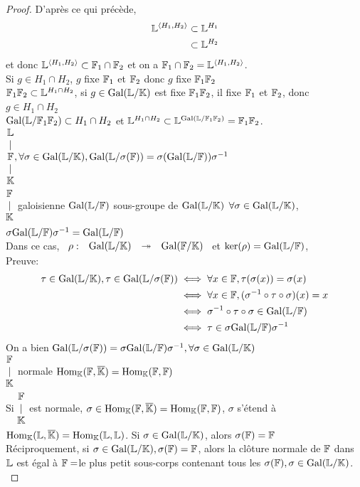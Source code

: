 \documentclass[]{report}
\begin{document}
\begin{proof}
        D'après ce qui précède,
        \begin{align*}
            \La^{\sca{H_1,H_2}}&\subset \La^{H_1}\\
            &\subset \La^{H_2}
        \end{align*}
        et donc $\La^{\sca{H_1,H_2}}\subset \Fa_1\cap \Fa_2$ et on a $\Fa_1\cap \Fa_2=\La^{\sca{H_1,H_2}}$.\\
        Si $g\in H_1\cap H_2$, $g$ fixe $\Fa_1$ et $\Fa_2$ donc $g$ fixe $\Fa_1\Fa_2$\\
        $\Fa_1\Fa_2\subset \La^{H_1\cap H_2}$, si $g\in \Gal(\La/\K)$ est fixe $\Fa_1\Fa_2$, il fixe $\Fa_1$ et $\Fa_2$, donc $g\in H_1\cap H_2$\\
        $\Gal(\La/\Fa_1\Fa_2)\subset H_1\cap H_2$ et $\La^{H_1\cap H_2}\subset \La^{\Gal(\La/\Fa_1\Fa_2)}=\Fa_1\Fa_2$.
        $\ext{\La}{\ext{\Fa}{\K}}, \forall \sigma\in \Gal(\La/\K),\Gal(\La/\sigma(\Fa))=\sigma(\Gal(\La/\Fa))\sigma^{-1}$\\
        $\ext{\Fa}{\K}$ galoisienne \ssi $\Gal(\La/\Fa)$ sous-groupe de $\Gal (\La/\K)$ \ssi $\forall \sigma\in \Gal(\La/\K)$, $\sigma\Gal(\La/\Fa)\sigma^{-1}=\Gal(\La/\Fa)$\\
        Dans ce cas, $\funtosurj{\rho}{\Gal(\La/\K)}{\Gal(\Fa/\K)}$ et $\ker(\rho)=\Gal(\La/\Fa)$,\\
        Preuve: 
        \begin{align*}
            \tau\in \Gal(\La/\K), \tau\in \Gal(\La/\sigma(\Fa))&\iff \forall x\in \Fa,\tau(\sigma(x))=\sigma(x)\\
            &\iff \forall x\in \Fa,(\sigma^{-1}\circ\tau\circ\sigma)(x)=x\\
            &\iff \sigma^{-1}\circ \tau \circ \sigma\in \Gal(\La/\Fa)\\
            &\iff \tau\in \sigma\Gal(\La/\Fa)\sigma^{-1}
        \end{align*}
        On a bien $\Gal(\La/\sigma(\Fa))=\sigma\Gal(\La/\Fa)\sigma^{-1},\forall \sigma\in \Gal(\La/\K)$\\
        $\ext{\Fa}{\K}$ normale \ssi $\Hom_{\K}(\Fa,\overline{\K})=\Hom_{\K}(\Fa,\Fa)$\\
        Si $\ext{\Fa}{\K}$ est normale, $\sigma\in \Hom_{\K}(\Fa,\overline{\K})=\Hom_{\K}(\Fa,\Fa)$, $\sigma$ s'étend à $\Hom_\K(\La,\overline{\K})=\Hom_\K(\La,\La)$. Si $\sigma\in \Gal(\La/\K)$, alors $\sigma(\Fa)=\Fa$\\
        Réciproquement, si $\sigma\in \Gal(\La/\K), \sigma(\Fa)=\Fa$, alors la clôture normale de $\Fa$ dans $\La$ est égal à $\Fa=$le plus petit sous-corps contenant tous les $\sigma(\Fa),\sigma\in \Gal(\La/\K)$.\\

\end{proof}
\end{document}
